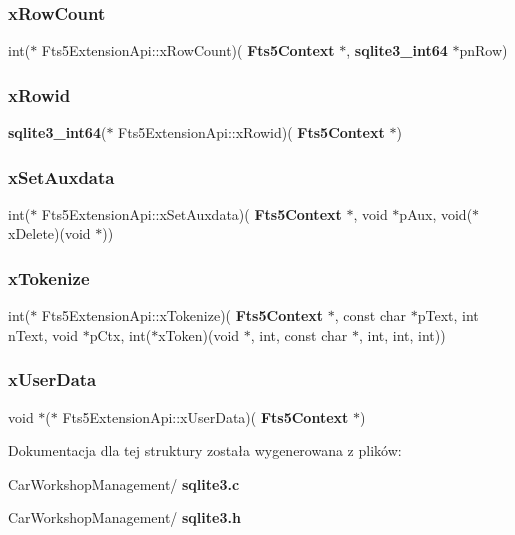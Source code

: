 \subsubsection{xRowCount}
{\footnotesize\ttfamily int($\ast$ Fts5\+Extension\+Api\+::x\+Row\+Count)(\textbf{ Fts5\+Context} $\ast$, \textbf{ sqlite3\+\_\+int64} $\ast$pn\+Row)}

\mbox{\label{struct_fts5_extension_api_aab4c236653ae8b3d1f306fc7af5c7ed1}} 
\subsubsection{xRowid}
{\footnotesize\ttfamily \textbf{ sqlite3\+\_\+int64}($\ast$ Fts5\+Extension\+Api\+::x\+Rowid)(\textbf{ Fts5\+Context} $\ast$)}

\mbox{\label{struct_fts5_extension_api_a466af4264428f467ee94408b64f408cb}} 
\subsubsection{xSetAuxdata}
{\footnotesize\ttfamily int($\ast$ Fts5\+Extension\+Api\+::x\+Set\+Auxdata)(\textbf{ Fts5\+Context} $\ast$, void $\ast$p\+Aux, void($\ast$x\+Delete)(void $\ast$))}

\mbox{\label{struct_fts5_extension_api_ae10d6563d3adc047eaba8db50eea1762}} 
\subsubsection{xTokenize}
{\footnotesize\ttfamily int($\ast$ Fts5\+Extension\+Api\+::x\+Tokenize)(\textbf{ Fts5\+Context} $\ast$, const char $\ast$p\+Text, int n\+Text, void $\ast$p\+Ctx, int($\ast$x\+Token)(void $\ast$, int, const char $\ast$, int, int, int))}

\mbox{\label{struct_fts5_extension_api_a1f71f2622761df6f157e7201879bf5df}} 
\subsubsection{xUserData}
{\footnotesize\ttfamily void $\ast$($\ast$ Fts5\+Extension\+Api\+::x\+User\+Data)(\textbf{ Fts5\+Context} $\ast$)}



Dokumentacja dla tej struktury została wygenerowana z plików\+:\begin{DoxyCompactItemize}
\item 
Car\+Workshop\+Management/\textbf{ sqlite3.\+c}\item 
Car\+Workshop\+Management/\textbf{ sqlite3.\+h}\end{DoxyCompactItemize}
